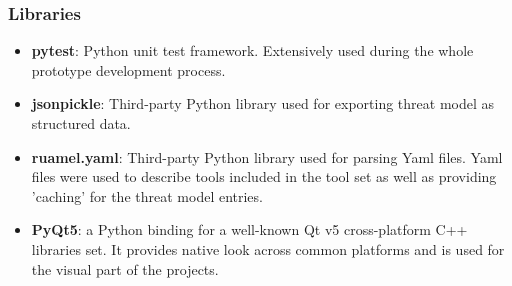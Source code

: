 \subsubsection{Libraries}\label{libraries}
\begin{itemize}
	\item \textbf{pytest}: Python unit test framework. Extensively used during the whole prototype development process.
	\item \textbf{jsonpickle}: Third-party Python library used for exporting threat model as structured data.
	\item \textbf{ruamel.yaml}: Third-party Python library used for parsing Yaml files. Yaml files were used to describe tools included in the tool set as well as providing 'caching' for the threat model entries. 
	\item \textbf{PyQt5}: a Python binding for a well-known Qt v5 cross-platform C++ libraries set. It provides native look across common platforms and is used for the visual part of the projects. 
\end{itemize}

